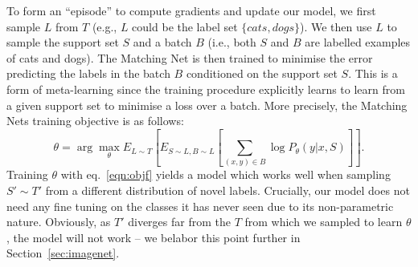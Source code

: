 To form an ``episode'' to compute gradients and update our model, we first sample $L$ from $T$ (e.g., $L$ could be the label set $\{cats,dogs\}$). We then use $L$ to sample the support set $S$ and a batch $B$ (i.e., both $S$ and $B$ are labelled examples of cats and dogs).
The Matching Net is then trained to minimise the error predicting the labels in the batch $B$ conditioned on the support set $S$.
This is a form of meta-learning since the training procedure explicitly learns to learn from a given support set to minimise a loss over a batch.
More precisely, the Matching Nets training objective is as follows:
\begin{equation}
\theta = \arg\max_\theta E_{L \sim T} \left[ E_{S \sim L, B \sim L}\left[\sum_{(x,y) \in B} \log P_\theta\left(y|x, S\right)\right]\right].
\label{eqn:objf}
\end{equation}
Training $\theta$ with eq.~\ref{eqn:objf} yields a model which works well when sampling $S' \sim T'$ from a different distribution of novel labels. Crucially, our model does not need any fine tuning on the classes it has never seen due to its non-parametric nature. Obviously, as $T'$ diverges far from the $T$ from which we sampled to learn $\theta$, the model will not work -- we belabor this point further in Section~\ref{sec:imagenet}.